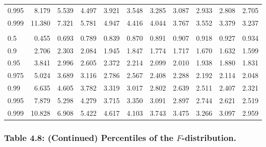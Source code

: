 \documentclass[
]{article}
\begin{document}
\begin{table}[H]
\begin{tabular}{lrrrrrrrrrr}
\hspace{1em}0.995 & 8.179 & 5.539 & 4.497 & 3.921 & 3.548 & 3.285 & 3.087 & 2.933 & 2.808 & 2.705\\
\hspace{1em}0.999 & 11.380 & 7.321 & 5.781 & 4.947 & 4.416 & 4.044 & 3.767 & 3.552 & 3.379 & 3.237\\
\addlinespace[0.3em]
\multicolumn{11}{l}{\textbf{$k_2=\infty$}}\\
\hspace{1em}0.5 & 0.455 & 0.693 & 0.789 & 0.839 & 0.870 & 0.891 & 0.907 & 0.918 & 0.927 & 0.934\\
\hspace{1em}0.9 & 2.706 & 2.303 & 2.084 & 1.945 & 1.847 & 1.774 & 1.717 & 1.670 & 1.632 & 1.599\\
\hspace{1em}0.95 & 3.841 & 2.996 & 2.605 & 2.372 & 2.214 & 2.099 & 2.010 & 1.938 & 1.880 & 1.831\\
\hspace{1em}0.975 & 5.024 & 3.689 & 3.116 & 2.786 & 2.567 & 2.408 & 2.288 & 2.192 & 2.114 & 2.048\\
\hspace{1em}0.99 & 6.635 & 4.605 & 3.782 & 3.319 & 3.017 & 2.802 & 2.639 & 2.511 & 2.407 & 2.321\\
\hspace{1em}0.995 & 7.879 & 5.298 & 4.279 & 3.715 & 3.350 & 3.091 & 2.897 & 2.744 & 2.621 & 2.519\\
\hspace{1em}0.999 & 10.828 & 6.908 & 5.422 & 4.617 & 4.103 & 3.743 & 3.475 & 3.266 & 3.097 & 2.959\\
\bottomrule
\end{tabular}
\end{table}

\newpage

\hypertarget{table-4.8-continued-percentiles-of-the-f-distribution.}{%
\subsubsection{\texorpdfstring{Table 4.8: (Continued) Percentiles of the
\(F\)-distribution.}{Table 4.8: (Continued) Percentiles of the F-distribution.}}\label{table-4.8-continued-percentiles-of-the-f-distribution.}}
\end{document}
